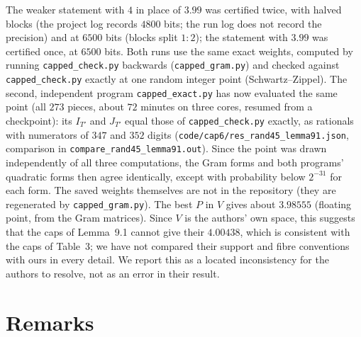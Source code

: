 \documentclass[11pt]{amsart}
\theoremstyle{definition}
\theoremstyle{remark}
\begin{document}
The weaker statement with $4$ in place of $3.99$ was certified twice, with
halved blocks (the project log records $4800$ bits; the run log does not
record the precision) and at $6500$ bits (blocks split $1:2$); the statement
with $3.99$ was certified once, at $6500$ bits. Both runs use the same exact
weights, computed by running \texttt{capped\_check.py} backwards
(\texttt{capped\_gram.py}) and checked against \texttt{capped\_check.py}
exactly at one random integer point (Schwartz--Zippel). The second,
independent program \texttt{capped\_exact.py} has now evaluated the same point
(all $273$ pieces, about $72$ minutes on three cores, resumed from a
checkpoint): its $I_{T'}$ and $J_{T'}$ equal those of \texttt{capped\_check.py}
exactly, as rationals with numerators of $347$ and $352$ digits
(\texttt{code/}\allowbreak\texttt{cap6/}\allowbreak\texttt{res\_rand45\_lemma91.json},
comparison in \texttt{compare\_rand45\_lemma91.out}). Since the point was drawn
independently of all three computations, the Gram forms and both programs'
quadratic forms then agree identically, except with probability below
$2^{-31}$ for each form. The saved weights themselves are not
in the repository (they are regenerated by \texttt{capped\_gram.py}). The best
$P$ in $V$ gives about $3.98555$ (floating point, from the Gram matrices).
Since $V$ is the authors' own space, this suggests that the caps of Lemma~9.1
cannot give their $4.00438$, which is consistent with the caps of Table~3; we
have not compared their support and fibre conventions with ours in every
detail. We report this as a
located inconsistency for the authors to resolve, not as an error in their
result.

\section{Remarks}
\end{document}
